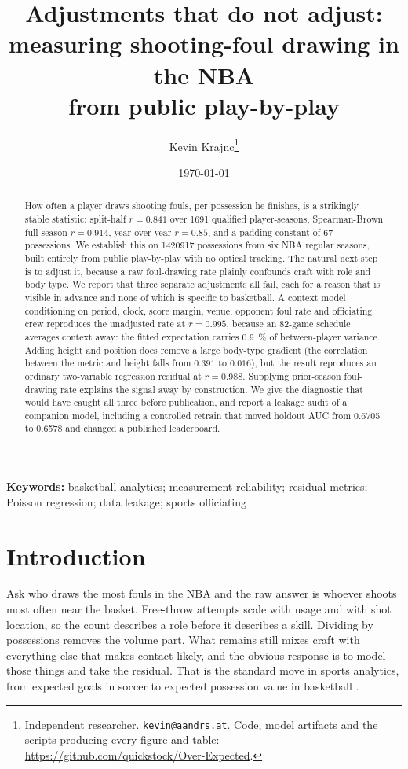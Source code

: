 \documentclass[11pt,letterpaper]{article}
\title{\bfseries Adjustments that do not adjust:\\
measuring shooting-foul drawing in the NBA\\
from public play-by-play}
\author{Kevin Krajnc\thanks{Independent researcher.
\texttt{kevin@aandrs.at}. Code, model artifacts and the scripts producing every
figure and table: \url{https://github.com/quickstock/Over-Expected}.}}
\date{\today}
\begin{document}
\maketitle

\begin{abstract}
\noindent
How often a player draws shooting fouls, per possession he finishes, is a
strikingly stable statistic: split-half $r = 0.841$ over \num{1691} qualified
player-seasons, Spearman-Brown full-season $r = 0.914$, year-over-year
$r = 0.85$, and a padding constant of 67 possessions. We establish this on
\num{1420917} possessions from six NBA regular seasons, built entirely from
public play-by-play with no optical tracking. The natural next step is to adjust it, because a raw foul-drawing rate plainly
confounds craft with role and body type. We report that three separate
adjustments all fail, each for a reason that is visible in advance and none of
which is specific to basketball. A context model conditioning on period, clock,
score margin, venue, opponent foul rate and officiating crew reproduces the
unadjusted rate at $r = 0.995$, because an 82-game schedule averages context
away: the fitted expectation carries \SI{0.9}{\percent} of between-player
variance. Adding height and position does remove a large body-type gradient
(the correlation between the metric and height falls from $0.391$ to $0.016$),
but the result reproduces an ordinary two-variable regression residual at
$r = 0.988$. Supplying prior-season foul-drawing rate explains the signal away
by construction. We give the diagnostic that would have caught all three before
publication, and report a leakage audit of a companion model, including a
controlled retrain that moved holdout AUC from 0.6705 to 0.6578 and changed a
published leaderboard.

\end{abstract}

\noindent\textbf{Keywords:} basketball analytics; measurement reliability;
residual metrics; Poisson regression; data leakage; sports officiating

\section{Introduction}

Ask who draws the most fouls in the NBA and the raw answer is whoever shoots
most often near the basket. Free-throw attempts scale with usage and with shot
location, so the count describes a role before it describes a skill. Dividing by
possessions removes the volume part. What remains still mixes craft with
everything else that makes contact likely, and the obvious response is to model
those things and take the residual. That is the standard move in sports
analytics, from expected goals in soccer \citep{rathke2017examination,
decroos2019actions} to expected possession value in basketball
\citep{cervone2016multiresolution}.
\end{document}
